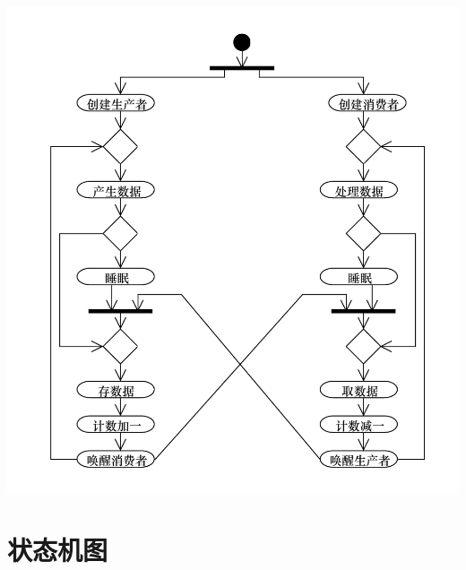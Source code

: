 \documentclass[compress]{beamer}
\begin{document}
\begin{frame}[plain]
  \vspace*{-4ex}
  \begin{center}
    \centering\includegraphics[height=1.00\textheight]{pc.pdf}
  \end{center}
\end{frame}

\section{状态机图}
\end{document}
